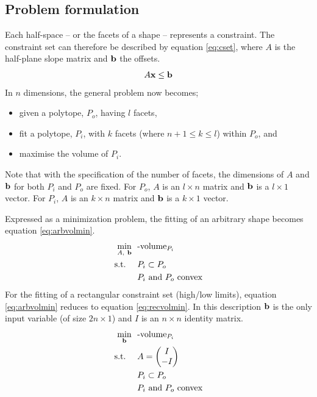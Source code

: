 \subsection{Problem formulation}
Each half-space -- or the facets of a shape -- represents a constraint.
The constraint set can therefore be described by equation \ref{eq:cset}, where $A$ is the half-plane slope matrix and ${\bf {b}}$ the offsets.
\begin{equation}
  \label{eq:cset}
  A{\bf {x}} \leq {\bf {b}}
\end{equation}
In $n$ dimensions, the general problem now becomes; 
\begin{itemize}
  \item given a polytope, $P_o$, having $l$ facets,
  \item fit a polytope, $P_i$, with $k$ facets (where $n+1 \leq k \le l$) within $P_o$, and
  \item maximise the volume of $P_i$.
\end{itemize} 
Note that with the specification of the number of facets, the dimensions of $A$ and ${\bf {b}}$ for both $P_i$ and $P_o$ are fixed.
For $P_o$, $A$ is an $l \times n$ matrix and ${\bf {b}}$ is a $l \times 1$ vector.
For $P_i$, $A$ is an $k \times n$ matrix and ${\bf {b}}$ is a $k \times 1$ vector.

Expressed as a minimization problem, the fitting of an arbitrary shape  becomes equation \ref{eq:arbvolmin}.
\begin{align}
  \label{eq:arbvolmin}
    \min_{A,~{\bf {b}}}~~&\text{-volume}_{P_i}\\
    \text{s.t.}~~~~ &P_i \subset P_o \notag \\
                    &P_i \text{~and~} P_o \text{~convex} \notag
\end{align}
For the fitting of a rectangular constraint set (high/low limits), equation \ref{eq:arbvolmin} reduces to equation \ref{eq:recvolmin}.
In this description ${\bf {b}}$ is the only input variable (of size $2n \times 1$) and $I$ is an $n\times n$ identity matrix.
\begin{align}
  \label{eq:recvolmin}
    \min_{{\bf {b}}}~~&\text{-volume}_{P_i}\\
    \text{s.t.}~~~~ &A = \begin{pmatrix} I \\ -I \end{pmatrix} \notag \\
                    &P_i \subset P_o \notag \\
                    &P_i \text{~and~} P_o \text{~convex} \notag
\end{align}

